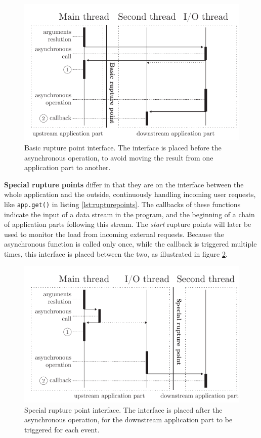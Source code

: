 \begin{figure}[h!]
\begin{center}
  \includegraphics[width=0.8\linewidth]{ressources/basicrp.pdf}
  \caption{Basic rupture point interface. \textnormal{The interface is placed before the asynchronous operation, to avoid moving the result from one application part to another.}}
  \label{fig:basicrp}
\end{center}
\end{figure}

\textbf{Special rupture points} differ in that they are on the interface between the whole application and the outside, continuously handling incoming user requests, like \texttt{app.get()} in listing \ref{lst:rupturepoints}.
The callbacks of these functions indicate the input of a data stream in the program, and the beginning of a chain of application parts following this stream.
The \textit{start} rupture points will later be used to monitor the load from incoming external requests.
Because the asynchronous function is called only once, while the callback is triggered multiple times, this interface is placed between the two, as illustrated in figure \ref{fig:specialrp}.

\begin{figure}[h!]
\begin{center}
  \includegraphics[width=0.8\linewidth]{ressources/specialrp.pdf}
  \caption{Special rupture point interface. \textnormal{The interface is placed after the asynchronous operation, for the downstream application part to be triggered for each event.}}
  \label{fig:specialrp}
\end{center}
\end{figure}

